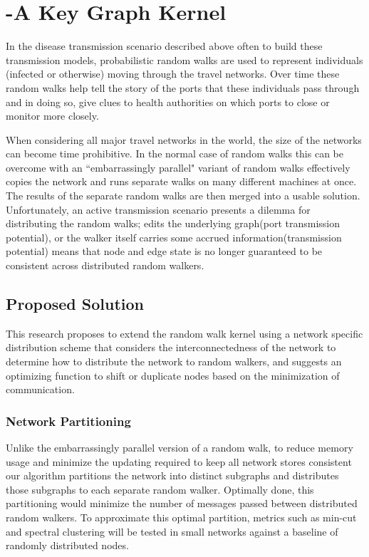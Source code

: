 \section{ -A Key Graph Kernel}\label{sec:problem-\myInitials}


In the disease transmission scenario described above often to build these transmission models, probabilistic random walks are used to represent individuals (infected or otherwise) moving through the travel networks. Over time these random walks help tell the story of the ports that these individuals pass through and in doing so, give clues to health authorities on which ports to close or monitor more closely\cite{eb_trans1}.

When considering all major travel networks in the world, the size of the networks can become time prohibitive. In the normal case of random walks this can be overcome with an ``embarrassingly parallel" variant of random walks effectively copies the network and runs separate walks on many different machines at once. The results of the separate random walks are then merged into a usable solution. Unfortunately, an active transmission scenario presents a dilemma for distributing the random walks; edits the underlying graph(port transmission potential), or the walker itself carries some accrued information(transmission potential) means that node and edge state is no longer guaranteed to be consistent across distributed random walkers.
\subsection{Proposed Solution}
This research proposes to extend the random walk kernel using a network specific distribution scheme that considers the interconnectedness of the network to determine how to distribute the network to random walkers, and suggests an optimizing function to shift or duplicate nodes based on the minimization of communication.

\subsubsection{Network Partitioning}
Unlike the embarrassingly parallel version of a random walk, to reduce memory usage and minimize the updating required to keep all network stores consistent our algorithm partitions the network into distinct subgraphs and distributes those subgraphs to each separate random walker. Optimally done, this partitioning would minimize the number of messages passed between distributed random walkers. To approximate this optimal partition, metrics such as min-cut and spectral clustering will be tested in small networks against a baseline of randomly distributed nodes.
